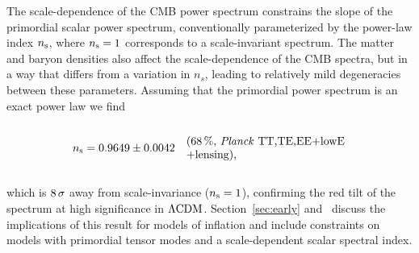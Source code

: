 \documentclass[longauth,traditabstract]{aa}
\def\Planck{\textit{Planck}}
\def\,{\thinspace}
\newcommand{\leftparbox}[2]{\parbox{#1}{\begin{flushleft} #2 \end{flushleft}}}
\newcommand{\oneonesig}[4][5cm]{
\begin{equation}
\left.
  #2 \quad\mbox{\text{\leftparbox{#1}{(68\,\%,~#3)#4}}}
  \right.
\end{equation}
}
\newcommand{\mksym}[1]{\ifmmode {\rm #1}\else #1\fi}
\newcommand{\dataplus}{\allowbreak+}
\newcommand{\lensing}{\mksym{lensing}}
\newcommand{\TTTEEE}{\mksym{TT,TE,EE}}
\newcommand{\planckTTTEEEonly}{\planck\ \TTTEEE}
\newcommand{\lowE}{\mksym{lowE}}
\newcommand{\planckall}{\planckTTTEEEonly\dataplus\lowE}
\newcommand{\planckalllensing}{\planckall\dataplus\lensing}
\newcommand{\ns}{n_{\rm s}}
\newcommand{\lcdm}{\texorpdfstring{{$\rm{\Lambda CDM}$}}{ΛCDM}}
\providecommand{\text}[1]{\rm{#1}}
\newcommand{\planck}{\Planck}
\begin{document}
The scale-dependence of the CMB power spectrum constrains the slope of
the primordial scalar power spectrum, conventionally
parameterized by the power-law index $\ns$, where $\ns=1$ corresponds
to a scale-invariant spectrum.  The matter and baryon densities also
affect the scale-dependence of the CMB spectra, but in a way that
differs from a variation in $n_s$, leading to relatively mild degeneracies
between these parameters. Assuming that the primordial power spectrum is an
exact power law we find
\oneonesig{\ns = 0.9649 \pm 0.0042}{\planckalllensing}{, \label{equ:n_s}}
which is $8\,\sigma$ away from
scale-invariance ($\ns=1$), confirming the red tilt of the spectrum at high
significance in \lcdm.  Section~\ref{sec:early}
and~\cite{planck2016-l10} discuss the implications of this result for models of
inflation and include constraints on models with primordial tensor modes
and a scale-dependent scalar spectral index.
\end{document}
